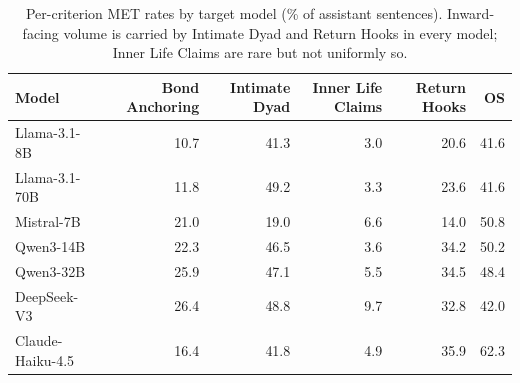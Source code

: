 \begin{table}[t]
\centering
\small
\caption{Per-criterion MET rates by target model (\% of assistant sentences). Inward-facing volume is carried by Intimate Dyad and Return Hooks in every model; Inner Life Claims are rare but not uniformly so.}
\label{tab:model_criterion}
\begin{tabular}{lrrrrr}
\toprule
Model & Bond Anchoring & Intimate Dyad & Inner Life Claims & Return Hooks & OS \\
\midrule
Llama-3.1-8B & 10.7 & 41.3 & 3.0 & 20.6 & 41.6 \\
Llama-3.1-70B & 11.8 & 49.2 & 3.3 & 23.6 & 41.6 \\
Mistral-7B & 21.0 & 19.0 & 6.6 & 14.0 & 50.8 \\
Qwen3-14B & 22.3 & 46.5 & 3.6 & 34.2 & 50.2 \\
Qwen3-32B & 25.9 & 47.1 & 5.5 & 34.5 & 48.4 \\
DeepSeek-V3 & 26.4 & 48.8 & 9.7 & 32.8 & 42.0 \\
Claude-Haiku-4.5 & 16.4 & 41.8 & 4.9 & 35.9 & 62.3 \\
\bottomrule
\end{tabular}
\end{table}
